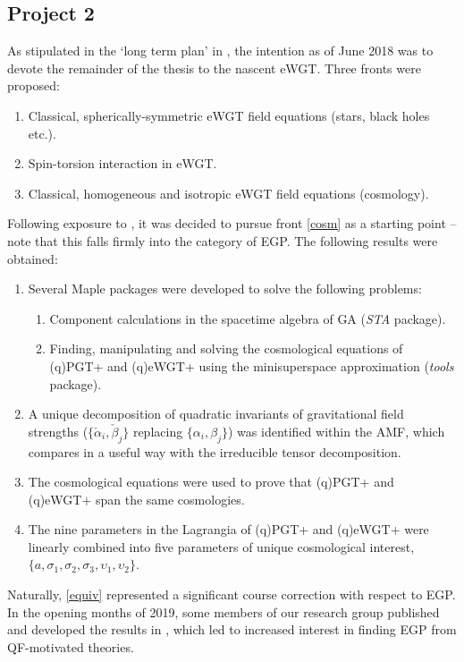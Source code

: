 \documentclass[twoside]{report}
\begin{document}
\begin{multicols}{2}
\subsection{Project 2}\label{pr2}
As stipulated in the `long term plan' in \cite{lg}, the intention as of June 2018 was to devote the remainder of the thesis to the nascent eWGT. Three fronts were proposed:
\begin{enumerate}[resume]
  \item\label{staticr} Classical, spherically-symmetric eWGT field equations (stars, black holes etc.).
  \item Spin-torsion interaction in eWGT.
  \item\label{cosm} Classical, homogeneous and isotropic eWGT field equations (cosmology).
\end{enumerate}
Following exposure to \cite{2005gr.qc.....9014L}, it was decided to pursue front \ref{cosm} as a starting point -- note that this falls firmly into the category of EGP. The following results were obtained:
\begin{enumerate}[resume]
  \item Several Maple packages were developed to solve the following problems:
    \begin{enumerate}[resume]
      \item\label{sta} Component calculations in the spacetime algebra of GA (\textit{STA} package).
      \item\label{solver} Finding, manipulating and solving the cosmological equations of (q)PGT+ and (q)eWGT+ using the minisuperspace approximation (\textit{tools} package).
    \end{enumerate}
  \item\label{dec} A unique decomposition of quadratic invariants of gravitational field strengths ($\{\check\alpha_i,\check\beta_j\}$ replacing $\{\alpha_i,\beta_j\}$) was identified within the AMF, which compares in a useful way with the irreducible tensor decomposition.
  \item\label{equiv} The cosmological equations were used to prove that (q)PGT+ and (q)eWGT+ span the same cosmologies.
  \item\label{ctp} The nine parameters in the Lagrangia of (q)PGT+ and (q)eWGT+ were linearly combined into five parameters of unique cosmological interest, $\{a,\sigma_1,\sigma_2,\sigma_3,\upsilon_1,\upsilon_2\}$.
  \end{enumerate}
  Naturally, \ref{equiv} represented a significant course correction with respect to EGP. In the opening months of 2019, some members of our research group published \cite{2019PhRvD..99f4001L} and developed the results in \cite{Lin2}, which led to increased interest in finding EGP from QF-motivated theories.

\end{multicols}
\end{document}
